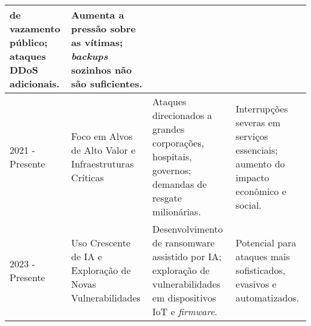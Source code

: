 \begin{table}[H]
\begin{tabularx}{\textwidth}{|l|p{3cm}|p{5cm}|p{5cm}|}
        de vazamento público; ataques DDoS adicionais. & Aumenta a pressão sobre as vítimas; \textit{backups} sozinhos não 
        são suficientes. \cite{CyberMaxxRansomwareHistory, Robb2024RansomwareHistory, ThreatDownALPHVBlackCat, AkamaiBlackCatRansomware} \\ \hline
        2021 - Presente & Foco em Alvos de Alto Valor e Infraestruturas Críticas & Ataques direcionados a grandes 
        corporações, hospitais, governos; demandas de resgate milionárias. & Interrupções severas em serviços essenciais; 
        aumento do impacto econômico e social. \cite{CyberMaxxRansomwareHistory, Robb2024RansomwareHistory} \\ \hline
        2023 - Presente & Uso Crescente de IA e Exploração de Novas Vulnerabilidades & Desenvolvimento de ransomware assistido 
        por IA; exploração de vulnerabilidades em dispositivos IoT e \textit{firmware}. & Potencial para ataques mais sofisticados, 
        evasivos e automatizados. \cite{ENISA_ETL_2023, KasperskyRansomwareReport2025} \\ \hline
    \end{tabularx}
\end{table}